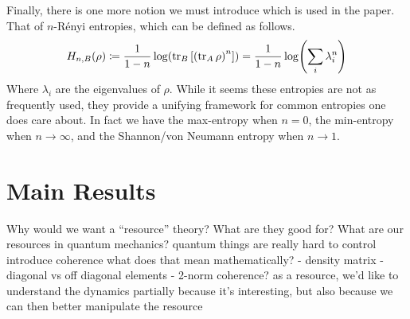 \documentclass[11pt,english]{article}
\theoremstyle{definition}
\begin{document}
Finally, there is one more notion we must introduce which is used in the paper. That of $n$-R\'enyi entropies, which can be defined as follows.
\begin{equation*}
	H_{n, B}(\rho)\coloneqq \frac{1}{1-n}\log(\tr_B\qty[\qty(\tr_A \rho)^n]) = \frac{1}{1-n}\log(\sum_i\lambda_i^n)
\end{equation*}
Where $\lambda_i$ are the eigenvalues of $\rho$. While it seems these entropies are not as frequently used, they provide a unifying framework for common entropies one does care about. In fact we have the max-entropy when $n = 0$, the min-entropy when $n\to\infty$, and the Shannon/von Neumann entropy when $n \to 1$.


\section{Main Results}

Why would we want a ``resource'' theory?
What are they good for?
What are our resources in quantum mechanics?
quantum things are really hard to control
introduce coherence
what does that mean mathematically?
- density matrix
- diagonal vs off diagonal elements
- 2-norm coherence?
as a resource, we'd like to understand the dynamics partially because it's interesting, but also because we can then better manipulate the resource
\end{document}
